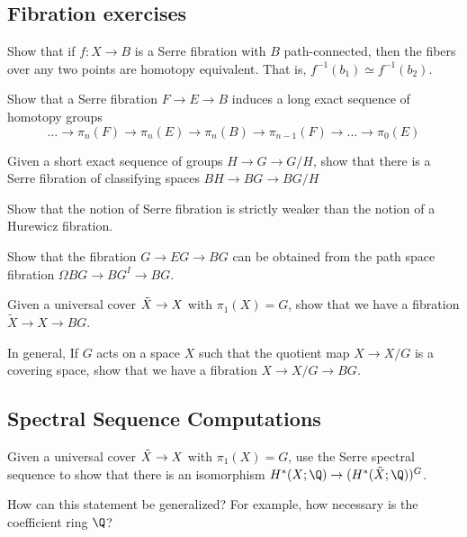 \subsection{Fibration exercises}

\begin{xca}
	Show that if $f: X \to B$ is a Serre fibration with $B$ path-connected, then the fibers over any two points are homotopy equivalent.  That is, $f^{-1}(b_1) \simeq f^{-1}(b_2)$.
\end{xca}

\begin{xca}
	Show that a Serre fibration $F \to E \to B$ induces a long exact sequence of homotopy groups $$\dots \to \pi_n(F) \to \pi_n(E) \to \pi_n(B) \to \pi_{n-1}(F) \to \dots \to \pi_0(E)$$
\end{xca}

\begin{xca}
	Given a short exact sequence of groups $H \to G \to G/H$, show that there is a Serre fibration of classifying spaces $BH \to BG \to BG/H$
\end{xca}

\begin{xca}
	Show that the notion of Serre fibration is strictly weaker than the notion of a Hurewicz fibration.
\end{xca}

\begin{xca}
	Show that the fibration $G \to EG \to BG$ can be obtained from the path space fibration $\Omega BG \to BG^I \to BG$.
\end{xca}

\begin{xca}
	Given a universal cover $\Tilde{X} \to X$ with $\pi_1(X) = G$, show that we have a fibration $\tilde{X} \to X \to BG$.
	
	In general, If $G$ acts on a space $X$ such that the quotient map $X \to X/G$ is a covering space, show that we have a fibration $X \to X/G \to BG$.
\end{xca}

\subsection{Spectral Sequence Computations}

\begin{xca}
	Given a universal cover $\Tilde{X} \to X$ with $\pi_1(X) = G$, use the Serre spectral sequence to show that there is an isomorphism $H^*(X; \Q) \to (H^*(\Tilde{X}; \Q))^G$.
	
	How can this statement be generalized? For example, how necessary is the coefficient ring $\Q$?
\end{xca}

